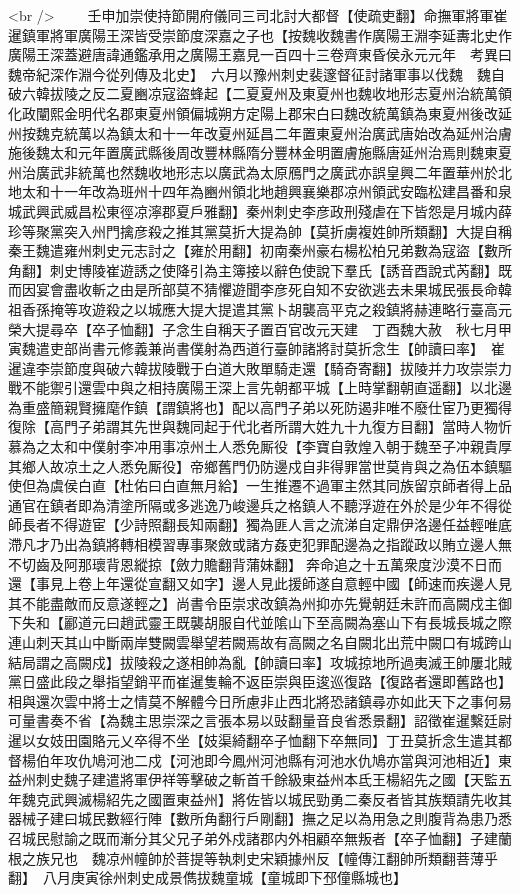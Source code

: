 <br />
　　壬申加崇使持節開府儀同三司北討大都督【使疏吏翻】命撫軍將軍崔暹鎮軍將軍廣陽王深皆受崇節度深嘉之子也【按魏收魏書作廣陽王淵李延夀北史作廣陽王深蓋避唐諱通鑑承用之廣陽王嘉見一百四十三卷齊東昏侯永元元年　考異曰魏帝紀深作淵今從列傳及北史】　六月以豫州刺史裴邃督征討諸軍事以伐魏　魏自破六韓拔陵之反二夏豳凉寇盜蜂起【二夏夏州及東夏州也魏收地形志夏州治統萬領化政闡熙金明代名郡東夏州領偏城朔方定陽上郡宋白曰魏改統萬鎮為東夏州後改延州按魏克統萬以為鎮太和十一年改夏州延昌二年置東夏州治廣武唐始改為延州治膚施後魏太和元年置廣武縣後周改豐林縣隋分豐林金明置膚施縣唐延州治焉則魏東夏州治廣武非統萬也然魏收地形志以廣武為太原鴈門之廣武亦誤皇興二年置華州於北地太和十一年改為班州十四年為豳州領北地趙興襄樂郡凉州領武安臨松建昌番和泉城武興武威昌松東徑凉濘郡夏戶雅翻】秦州刺史李彦政刑殘虐在下皆怨是月城内薛珍等聚黨突入州門擒彦殺之推其黨莫折大提為帥【莫折虜複姓帥所類翻】大提自稱秦王魏遣雍州刺史元志討之【雍於用翻】初南秦州豪右楊松柏兄弟數為寇盜【數所角翻】刺史博陵崔遊誘之使降引為主簿接以辭色使說下羣氏【誘音酉說式芮翻】既而因宴會盡收斬之由是所部莫不猜懼遊聞李彦死自知不安欲逃去未果城民張長命韓祖香孫掩等攻遊殺之以城應大提大提遣其黨卜胡襲高平克之殺鎮將赫連略行臺高元榮大提尋卒【卒子恤翻】子念生自稱天子置百官改元天建　丁酉魏大赦　秋七月甲寅魏遣吏部尚書元修義兼尚書僕射為西道行臺帥諸將討莫折念生【帥讀曰率】　崔暹違李崇節度與破六韓拔陵戰于白道大敗單騎走還【騎奇寄翻】拔陵并力攻崇崇力戰不能禦引還雲中與之相持廣陽王深上言先朝都平城【上時掌翻朝直遥翻】以北邊為重盛簡親賢擁麾作鎮【謂鎮將也】配以高門子弟以死防遏非唯不廢仕宦乃更獨得復除【高門子弟謂其先世與魏同起于代北者所謂大姓九十九復方目翻】當時人物忻慕為之太和中僕射李冲用事凉州土人悉免厮役【李寶自敦煌入朝于魏至子冲親貴厚其鄉人故凉土之人悉免厮役】帝鄉舊門仍防邊戍自非得罪當世莫肯與之為伍本鎮驅使但為虞侯白直【杜佑曰白直無月給】一生推遷不過軍主然其同族留京師者得上品通官在鎮者即為清塗所隔或多逃逸乃峻邊兵之格鎮人不聽浮遊在外於是少年不得從師長者不得遊宦【少詩照翻長知兩翻】獨為匪人言之流涕自定鼎伊洛邊任益輕唯底滯凡才乃出為鎮將轉相模習專事聚斂或諸方姦吏犯罪配邊為之指蹤政以賄立邊人無不切齒及阿那瓌背恩縱掠【斂力贍翻背蒲妹翻】奔命追之十五萬衆度沙漠不日而還【事見上卷上年還從宣翻又如字】邊人見此援師遂自意輕中國【師速而疾邊人見其不能盡敵而反意遂輕之】尚書令臣崇求改鎮為州抑亦先覺朝廷未許而高闕戍主御下失和【酈道元曰趙武靈王既襲胡服自代並隂山下至高闕為塞山下有長城長城之際連山刺天其山中斷兩岸雙闕雲舉望若闕焉故有高闕之名自闕北出荒中闕口有城跨山結局謂之高闕戍】拔陵殺之遂相帥為亂【帥讀曰率】攻城掠地所過夷滅王帥屢北賊黨日盛此段之舉指望銷平而崔暹隻輪不返臣崇與臣逡巡復路【復路者還即舊路也】相與還次雲中將士之情莫不解體今日所慮非止西北將恐諸鎮尋亦如此天下之事何易可量書奏不省【為魏主思崇深之言張本易以䜴翻量音良省悉景翻】詔徵崔暹繫廷尉暹以女妓田園賂元乂卒得不坐【妓渠綺翻卒子恤翻下卒無同】丁丑莫折念生遣其都督楊伯年攻仇鳩河池二戍【河池即今鳳州河池縣有河池水仇鳩亦當與河池相近】東益州刺史魏子建遣將軍伊祥等擊破之斬首千餘級東益州本氐王楊紹先之國【天監五年魏克武興滅楊紹先之國置東益州】將佐皆以城民勁勇二秦反者皆其族類請先收其器械子建曰城民數經行陣【數所角翻行戶剛翻】撫之足以為用急之則腹背為患乃悉召城民慰諭之既而漸分其父兄子弟外戍諸郡内外相顧卒無叛者【卒子恤翻】子建蘭根之族兄也　魏凉州幢帥於菩提等執刺史宋穎據州反【幢傳江翻帥所類翻菩薄乎翻】　八月庚寅徐州刺史成景儁拔魏童城【童城即下邳僮縣城也】